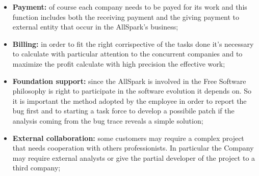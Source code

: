 \begin{itemize}
  \item {\bf Payment:} of course each company needs to be payed for its work and this function includes both the receiving payment and the giving payment to external entity that occur in the AllSpark's business;
  \item {\bf Billing:} in order to fit the right corrispective of the tasks done it's necessary to calculate with particular attention to the concurrent companies and to maximize the profit calculate with high precision the effective work;
  \item {\bf Foundation support:} since the AllSpark is involved in the Free Software philosophy is right to participate in the software evolution it depends on. So it is important the method adopted by the employee in order to report the bug first and to starting a task force to develop a possibile patch if the analysis coming from the bug trace reveals a simple solution;
  \item {\bf External collaboration:} some customers may require a complex project that needs cooperation with others professionists. In particular the Company may require external analysts or give the partial developer of the project to a third company;
\end{itemize}



